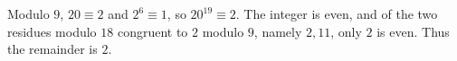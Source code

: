 Modulo $9$, $20\equiv2$ and $2^6\equiv1$, so $20^{19}\equiv2$. The integer is even, and of the two residues modulo $18$ congruent to $2$ modulo $9$, namely $2,11$, only $2$ is even. Thus the remainder is $\boxed2$.

